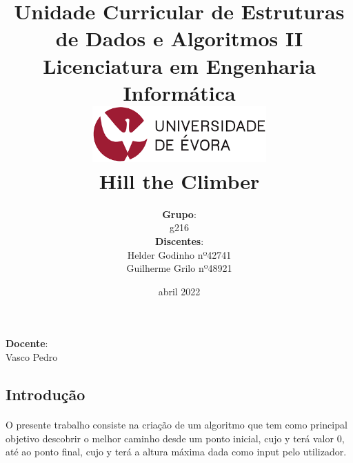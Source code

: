 \documentclass[12pt]{article}
\title {
{\large Unidade Curricular de Estruturas de Dados e Algoritmos II 
\\ Licenciatura em Engenharia Informática}
\\ \vspace{2 cm}
\includegraphics[width=0.5\textwidth]{ue}
\\[1 cm]\textbf{\Huge Hill the Climber}\vspace{1 cm}
}
\author {
\normalsize \textbf{Grupo}:\\ \normalsize g216
\vspace{0.3 cm}
\\ \normalsize \textbf{Discentes}:\\ \normalsize Helder Godinho nº42741\\ \normalsize Guilherme Grilo nº48921
}
\date{\normalsize abril 2022}
\begin{document}
\maketitle
\vspace{1.5 cm}
\begin{center}
\normalsize \textbf{Docente}: \\ \normalsize Vasco Pedro
\end{center}
\thispagestyle{empty}
\newpage
\setcounter{page}{1}
 \renewcommand{\contentsname}{\begin{center}
 \LARGE Índice
 \end{center}}



\tableofcontents
\newpage
\begin{center}
\section{Introdução}
\end{center}
\paragraph{}
O presente trabalho consiste na criação de um algoritmo que tem como principal objetivo descobrir o melhor caminho desde um ponto inicial, cujo y terá valor 0, até ao ponto final, cujo y terá a altura máxima dada como input pelo utilizador.
\end{document}

